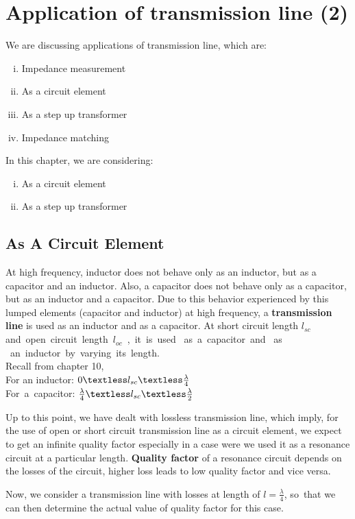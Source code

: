 \chapter{Application of transmission line (2)}\label{lec:lec11}
We are discussing applications of transmission line, which are:
\begin{enumerate}[(i)]
\item Impedance measurement
\item As a circuit element
\item As a step up transformer
\item Impedance matching 
\end{enumerate}

In this chapter, we are considering:
\begin{enumerate}[(i)]
\item As a circuit element
\item As a step up transformer
\end{enumerate}

\section{As A Circuit Element}
At high frequency, inductor does not behave only as an inductor, but as a capacitor and an inductor. Also, a capacitor does not behave only as a capacitor, but as an inductor and a capacitor. Due to this behavior experienced by this lumped elements (capacitor and inductor) at high frequency, a \textbf{transmission line} is used as an inductor and as a capacitor.
At short circuit length $l_{sc}$ and\ open\ circuit\ length\ $l_{oc}$\ ,\ it\ is\ used \ as\ a\ capacitor\ and \ as \ an\ inductor\ by\ varying\ its\ length.\\
Recall from chapter 10,\\
For an inductor: $0 \textless l_{sc} \textless 
\frac{\lambda}{4}$\\
For\ a\ capacitor: $\frac{\lambda}{4} \textless l_{sc} \textless \frac{\lambda}{2} $


Up to this point, we have dealt with lossless transmission line, which imply, for the use of open or short circuit transmission line as a circuit element, we expect to get an infinite quality factor especially in a case were we used it as a resonance circuit at a particular length. \textbf{Quality factor} of a resonance circuit depends on the losses of the circuit, higher loss leads to low quality factor and vice versa.

Now, we consider a transmission line with losses at length of $ l=\frac{\lambda}{4} $, so\ that we can then determine the actual value of quality factor for this case.\\

